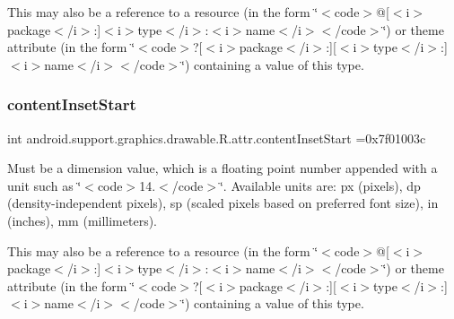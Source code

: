 This may also be a reference to a resource (in the form \char`\"{}$<$code$>$@\mbox{[}$<$i$>$package$<$/i$>$\+:\mbox{]}$<$i$>$type$<$/i$>$\+:$<$i$>$name$<$/i$>$$<$/code$>$\char`\"{}) or theme attribute (in the form \char`\"{}$<$code$>$?\mbox{[}$<$i$>$package$<$/i$>$\+:\mbox{]}\mbox{[}$<$i$>$type$<$/i$>$\+:\mbox{]}$<$i$>$name$<$/i$>$$<$/code$>$\char`\"{}) containing a value of this type. \mbox{\label{classandroid_1_1support_1_1graphics_1_1drawable_1_1R_1_1attr_aadd84bdaef566218b8f062338555e3d7}} 
\subsubsection{\texorpdfstring{content\+Inset\+Start}{contentInsetStart}}
{\footnotesize\ttfamily int android.\+support.\+graphics.\+drawable.\+R.\+attr.\+content\+Inset\+Start =0x7f01003c\hspace{0.3cm}{\ttfamily [static]}}

Must be a dimension value, which is a floating point number appended with a unit such as \char`\"{}$<$code$>$14.\+5sp$<$/code$>$\char`\"{}. Available units are\+: px (pixels), dp (density-\/independent pixels), sp (scaled pixels based on preferred font size), in (inches), mm (millimeters). 

This may also be a reference to a resource (in the form \char`\"{}$<$code$>$@\mbox{[}$<$i$>$package$<$/i$>$\+:\mbox{]}$<$i$>$type$<$/i$>$\+:$<$i$>$name$<$/i$>$$<$/code$>$\char`\"{}) or theme attribute (in the form \char`\"{}$<$code$>$?\mbox{[}$<$i$>$package$<$/i$>$\+:\mbox{]}\mbox{[}$<$i$>$type$<$/i$>$\+:\mbox{]}$<$i$>$name$<$/i$>$$<$/code$>$\char`\"{}) containing a value of this type. \mbox{\label{classandroid_1_1support_1_1graphics_1_1drawable_1_1R_1_1attr_ad0cb8399a412ab962ec7ed754d7e6dc7}} 
